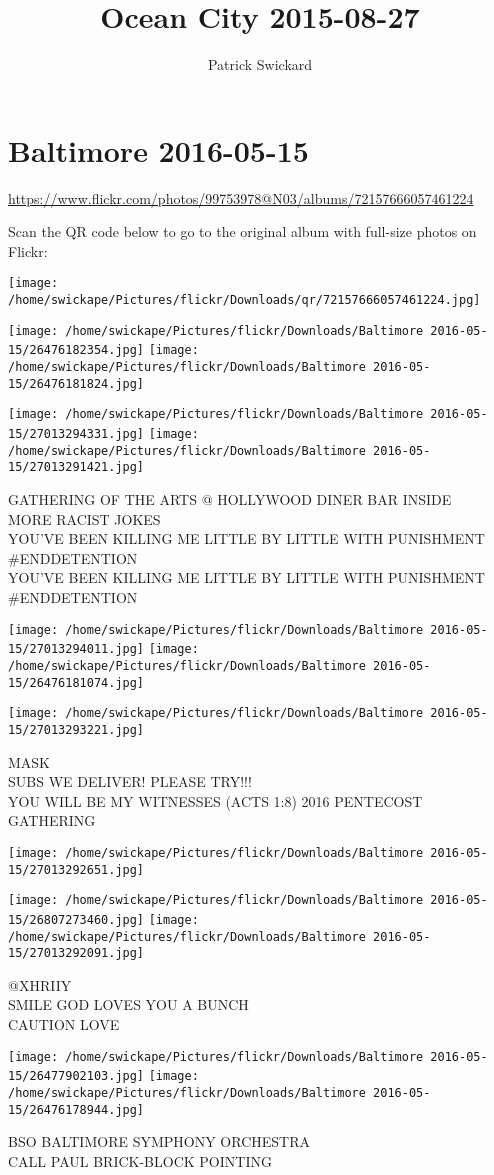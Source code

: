 \documentclass[10pt,letterpaper]{article}
\title{Ocean City 2015-08-27}
\author{Patrick Swickard}
\date{}
\begin{document}
\section*{Baltimore 2016-05-15}

\url{https://www.flickr.com/photos/99753978@N03/albums/72157666057461224}

Scan the QR code below to go to the original album with full-size photos on Flickr:

\texttt{[image: /home/swickape/Pictures/flickr/Downloads/qr/72157666057461224.jpg]}
\pagebreak

\texttt{[image: /home/swickape/Pictures/flickr/Downloads/Baltimore 2016-05-15/26476182354.jpg]}
\texttt{[image: /home/swickape/Pictures/flickr/Downloads/Baltimore 2016-05-15/26476181824.jpg]}

\texttt{[image: /home/swickape/Pictures/flickr/Downloads/Baltimore 2016-05-15/27013294331.jpg]}
\texttt{[image: /home/swickape/Pictures/flickr/Downloads/Baltimore 2016-05-15/27013291421.jpg]}

GATHERING OF THE ARTS @ HOLLYWOOD DINER BAR INSIDE\\
MORE RACIST JOKES\\
YOU'VE BEEN KILLING ME LITTLE BY LITTLE WITH PUNISHMENT \#ENDDETENTION\\
YOU'VE BEEN KILLING ME LITTLE BY LITTLE WITH PUNISHMENT \#ENDDETENTION
\pagebreak

\texttt{[image: /home/swickape/Pictures/flickr/Downloads/Baltimore 2016-05-15/27013294011.jpg]}
\texttt{[image: /home/swickape/Pictures/flickr/Downloads/Baltimore 2016-05-15/26476181074.jpg]}

\texttt{[image: /home/swickape/Pictures/flickr/Downloads/Baltimore 2016-05-15/27013293221.jpg]}

MASK\\
SUBS WE DELIVER!  PLEASE TRY!!!\\
YOU WILL BE MY WITNESSES (ACTS 1:8) 2016 PENTECOST GATHERING
\pagebreak

\texttt{[image: /home/swickape/Pictures/flickr/Downloads/Baltimore 2016-05-15/27013292651.jpg]}

\vspace{0.25in}
\texttt{[image: /home/swickape/Pictures/flickr/Downloads/Baltimore 2016-05-15/26807273460.jpg]}
\texttt{[image: /home/swickape/Pictures/flickr/Downloads/Baltimore 2016-05-15/27013292091.jpg]}

@XHRIIY\\
SMILE GOD LOVES YOU A BUNCH\\
CAUTION LOVE
\pagebreak

\texttt{[image: /home/swickape/Pictures/flickr/Downloads/Baltimore 2016-05-15/26477902103.jpg]}
\texttt{[image: /home/swickape/Pictures/flickr/Downloads/Baltimore 2016-05-15/26476178944.jpg]}

BSO BALTIMORE SYMPHONY ORCHESTRA\\
CALL PAUL BRICK{-}BLOCK POINTING
\pagebreak
\end{document}
